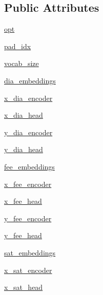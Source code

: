 \subsection*{Public Attributes}
\begin{DoxyCompactItemize}
\item 
\hyperlink{classprojects_1_1self__feeding_1_1modules_1_1SelfFeedingModel_a86b883b434d874848d66e4ddcc4f1f50}{opt}
\item 
\hyperlink{classprojects_1_1self__feeding_1_1modules_1_1SelfFeedingModel_af6f634a996f01dfe4ca723f8fa3dfefb}{pad\+\_\+idx}
\item 
\hyperlink{classprojects_1_1self__feeding_1_1modules_1_1SelfFeedingModel_adb65a171d73cc95e733c09b1934c638f}{vocab\+\_\+size}
\item 
\hyperlink{classprojects_1_1self__feeding_1_1modules_1_1SelfFeedingModel_a528f2ba6f18fc1d45c19f2a514cc120b}{dia\+\_\+embeddings}
\item 
\hyperlink{classprojects_1_1self__feeding_1_1modules_1_1SelfFeedingModel_ad476678f811bfbb18fdd0bd945dd8dcd}{x\+\_\+dia\+\_\+encoder}
\item 
\hyperlink{classprojects_1_1self__feeding_1_1modules_1_1SelfFeedingModel_a912f7b6c38a8f5e87938a3b6c19944d4}{x\+\_\+dia\+\_\+head}
\item 
\hyperlink{classprojects_1_1self__feeding_1_1modules_1_1SelfFeedingModel_a5e27383a4a80f19bc2a6b66b2c8963fe}{y\+\_\+dia\+\_\+encoder}
\item 
\hyperlink{classprojects_1_1self__feeding_1_1modules_1_1SelfFeedingModel_a650059d7d61d31efcf9b05015c7184a7}{y\+\_\+dia\+\_\+head}
\item 
\hyperlink{classprojects_1_1self__feeding_1_1modules_1_1SelfFeedingModel_afaa2e8af7a28cb39535da58b7fff954b}{fee\+\_\+embeddings}
\item 
\hyperlink{classprojects_1_1self__feeding_1_1modules_1_1SelfFeedingModel_a6b37f9fa2bd0522c1a384ee519721616}{x\+\_\+fee\+\_\+encoder}
\item 
\hyperlink{classprojects_1_1self__feeding_1_1modules_1_1SelfFeedingModel_a004d70a0a552c915a13720675dcce1de}{x\+\_\+fee\+\_\+head}
\item 
\hyperlink{classprojects_1_1self__feeding_1_1modules_1_1SelfFeedingModel_ac312bceb5c96f1e4ddea5f38390272ed}{y\+\_\+fee\+\_\+encoder}
\item 
\hyperlink{classprojects_1_1self__feeding_1_1modules_1_1SelfFeedingModel_a6f4541b0ea2e461e61b922ef48c5a334}{y\+\_\+fee\+\_\+head}
\item 
\hyperlink{classprojects_1_1self__feeding_1_1modules_1_1SelfFeedingModel_a96bf763bbcf87b6d7d05be23d14f8936}{sat\+\_\+embeddings}
\item 
\hyperlink{classprojects_1_1self__feeding_1_1modules_1_1SelfFeedingModel_adc8027dc9d47e857ef35530220c7a3a0}{x\+\_\+sat\+\_\+encoder}
\item 
\hyperlink{classprojects_1_1self__feeding_1_1modules_1_1SelfFeedingModel_ab842b98b0938d1ce477d5954f9bf005f}{x\+\_\+sat\+\_\+head}
\end{DoxyCompactItemize}


